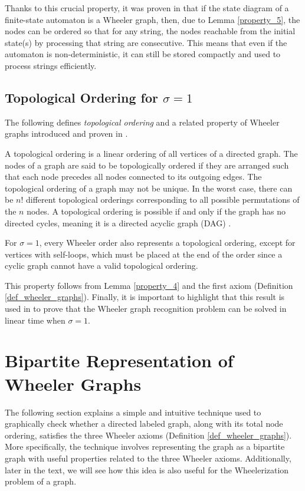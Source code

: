 Thanks to this crucial property, it was proven in \cite{gagie2017wheeler} that if the state diagram of a finite-state automaton is a Wheeler graph, then, due to Lemma \ref{property_5}, the nodes can be ordered so that for any string, the nodes reachable from the initial state(s) by processing that string are consecutive. This means that even if the automaton is non-deterministic, it can still be stored compactly and used to process strings efficiently.

\subsection{Topological Ordering for \texorpdfstring{$\sigma=1$}{Lg}}
The following defines \textit{topological ordering} and a related property of Wheeler graphs introduced and proven in \cite{inapproximabilityWheelerGraphs}.

\begin{definition}
    A topological ordering is a linear ordering of all vertices of a directed graph. The nodes of a graph are said to be topologically ordered if they are arranged such that each node precedes all nodes connected to its outgoing edges. The topological ordering of a graph may not be unique. In the worst case, there can be $n!$ different topological orderings corresponding to all possible permutations of the $n$ nodes. A topological ordering is possible if and only if the graph has no directed cycles, meaning it is a directed acyclic graph (DAG) \cite{topol16ogicalOrdering}.
\end{definition}

\begin{lemma} \label{property_6}
    For $\sigma=1$, every Wheeler order also represents a topological ordering, except for vertices with self-loops, which must be placed at the end of the order since a cyclic graph cannot have a valid topological ordering.
\end{lemma}

This property follows from Lemma \ref{property_4} and the first axiom (Definition \ref{def_wheeler_graphs}). Finally, it is important to highlight that this result is used in \cite{inapproximabilityWheelerGraphs} to prove that the Wheeler graph recognition problem can be solved in linear time when $\sigma=1$.

\begingroup
\sloppy
\raggedright
\section{Bipartite Representation of Wheeler Graphs} \label{rapp_bipartita}
\endgroup
The following section explains a simple and intuitive technique used to graphically check whether a directed labeled graph, along with its total node ordering, satisfies the three Wheeler axioms (Definition \ref{def_wheeler_graphs}). More specifically, the technique involves representing the graph as a bipartite graph with useful properties related to the three Wheeler axioms. Additionally, later in the text, we will see how this idea is also useful for the Wheelerization problem of a graph.

